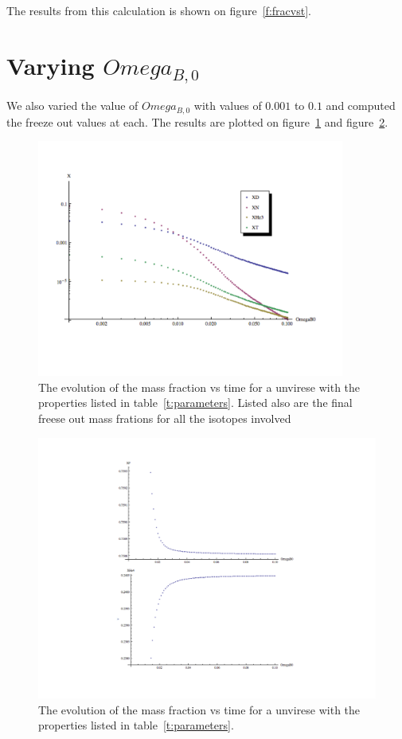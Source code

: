 \documentclass[twoside]{article}
\begin{document}
The results from this calculation is shown on figure~\ref{f:fracvst}.





\section{Varying $Omega_{B,0}$} 
We also varied the value of $Omega_{B,0}$ with values of $0.001$ to $0.1$ and computed the freeze out values at each. The results are plotted on figure~\ref{f:fracvsomeg1} and figure~\ref{f:fracvsomeg2}. 

\begin{figure}[h!]
  \centering
	\includegraphics[width=0.9\textwidth]{fracvsomeg1.pdf}
  \caption{The evolution of the mass fraction vs time for a unvirese with the properties listed in table~\ref{t:parameters}. Listed also are the final freese out mass frations for all the isotopes involved  }\label{f:fracvsomeg1}
\end{figure}
\begin{figure}[h!]
  \centering
	\includegraphics[width=1\textwidth]{fracvsomeg2.pdf}
  \caption{The evolution of the mass fraction vs time for a unvirese with the properties listed in table~\ref{t:parameters}.}\label{f:fracvsomeg2}
\end{figure}
\end{document}
